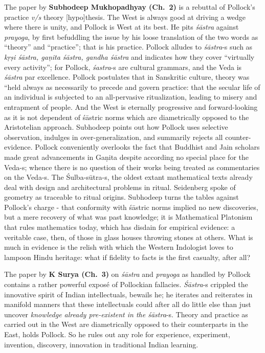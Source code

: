 The paper by {\bf Subhodeep Mukhopadhyay (Ch.~2)} is a rebuttal of Pollock’s practice {\sl v/s} theory [hypo]thesis. The West is always good at driving a wedge where there is unity, and Pollock is West at its best. He pits {\sl śāstra} against {\sl prayoga}, by first befuddling the issue by his loose translation of the two words as “theory” and “practice”; that is his practice. Pollock alludes to {\sl śāstra}-s such as {\sl kṛṣi śāstra, gaṇita śāstra, gandha śāstra} and indicates how they cover “virtually every activity”; for Pollock, {\sl śastra}-s are cultural grammars, and the Veda is {\sl śāstra} par excellence. Pollock postulates that in Sanskritic culture, theory was “held always as necessarily to precede and govern practice: that the secular life of an individual is subjected to an all-pervasive ritualization, leading to misery and entrapment of people. And the West is eternally progressive and forward-looking as it is not dependent of śāstric norms which are diametrically opposed to the Aristotelian approach. Subhodeep points out how Pollock uses selective observation, indulges in over-generalization, and summarily rejects all counter-evidence. Pollock conveniently overlooks the fact that Buddhist and Jain scholars made great advancements in Gaṇita despite according no special place for the Veda-s; whence there is no question of their works being treated as commentaries on the Veda-s. The Śulba-sūtra-s, the oldest extant mathematical texts already deal with design and architectural problems in ritual. Seidenberg spoke of geometry as traceable to ritual origins. Subhodeep turns the tables against Pollock’s charge - that conformity with śāstric norms implied no new discoveries, but a mere recovery of what was past knowledge; it is Mathematical Platonism that rules mathematics today, which has disdain for empirical evidence: a veritable case, then, of those in glass houses throwing stones at others. What is much in evidence is the relish with which the Western Indologist loves to lampoon Hindu heritage: what if fidelity to facts is the first casualty, after all?

The paper by {\bf K Surya (Ch.~3)} on {\sl śāstra} and {\sl prayoga} as handled by Pollock contains a rather powerful exposé of Pollockian fallacies. {\sl Śāstra}-s crippled the innovative spirit of Indian intellectuals, bewails he; he iterates and reiterates in manifold manners that these intellectuals could after all do little else than just uncover {\sl knowledge already pre-existent in the śāstra}-s. Theory and practice as carried out in the West are diametrically opposed to their counterparts in the East, holds Pollock. So he rules out any role for experience, experiment, invention, discovery, innovation in traditional Indian learning.

